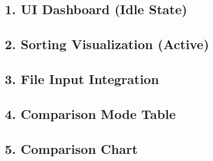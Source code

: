\documentclass[11pt,a4paper]{article}
\begin{document}

\subsection*{1. UI Dashboard (Idle State)}

\subsection*{2. Sorting Visualization (Active)}

\subsection*{3. File Input Integration}

\subsection*{4. Comparison Mode Table}

\subsection*{5. Comparison Chart}
\end{document}
